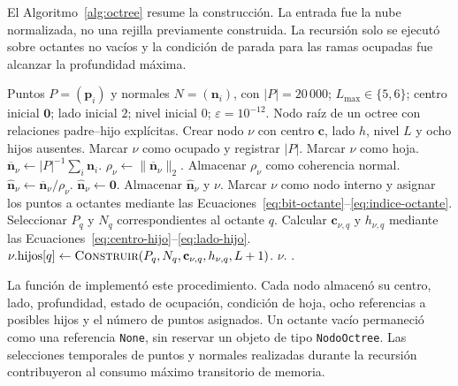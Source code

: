 El Algoritmo~\ref{alg:octree} resume la construcción. La entrada fue la nube normalizada, no una rejilla previamente construida. La recursión solo se ejecutó sobre octantes no vacíos y la condición de parada para las ramas ocupadas fue alcanzar la profundidad máxima.
\begin{algorithm}[H]
\caption{Construcción recursiva del octree adaptativo con poda de octantes vacíos.}
\label{alg:octree}
\begin{algorithmic}[1]
\Require Puntos $P=(\mathbf p_i)$ y normales $N=(\mathbf n_i)$, con $|P|=20\,000$; $L_{\max}\in\{5,6\}$; centro inicial $\mathbf{0}$; lado inicial $2$; nivel inicial $0$; $\varepsilon=10^{-12}$.
\Ensure Nodo raíz de un octree con relaciones padre--hijo explícitas.
    \State Crear nodo $\nu$ con centro $\mathbf c$, lado $h$, nivel $L$ y ocho hijos ausentes.
    \State Marcar $\nu$ como ocupado y registrar $|P|$.
        \State Marcar $\nu$ como hoja.
        \State $\overline{\mathbf n}_\nu \gets |P|^{-1}\sum_i \mathbf n_i$.
        \State $\rho_\nu\gets\|\overline{\mathbf n}_\nu\|_2$.
        \State Almacenar $\rho_\nu$ como coherencia normal.
        \If{$\rho_\nu>\varepsilon$}
            \State $\widehat{\mathbf n}_\nu\gets\overline{\mathbf n}_\nu/\rho_\nu$.
        \Else
            \State $\widehat{\mathbf n}_\nu\gets\mathbf{0}$.
        \EndIf
        \State Almacenar $\widehat{\mathbf n}_\nu$ y \Return $\nu$.
    \EndIf
    \State Marcar $\nu$ como nodo interno y asignar los puntos a octantes mediante las Ecuaciones~\eqref{eq:bit-octante}--\eqref{eq:indice-octante}.
        \State Seleccionar $P_q$ y $N_q$ correspondientes al octante $q$.
            \State Calcular $\mathbf c_{\nu,q}$ y $h_{\nu,q}$ mediante las Ecuaciones~\eqref{eq:centro-hijo}--\eqref{eq:lado-hijo}.
            \State $\nu.\mathrm{hijos}[q]\gets\Call{Construir}{P_q,N_q,\mathbf c_{\nu,q},h_{\nu,q},L+1}$.
        \EndIf
    \EndFor
    \State \Return $\nu$.
\EndFunction
\State \Return {}.
\end{algorithmic}
\end{algorithm}

La función \protect{} de \protect{} implementó este procedimiento. Cada nodo almacenó su centro, lado, profundidad, estado de ocupación, condición de hoja, ocho referencias a posibles hijos y el número de puntos asignados. Un octante vacío permaneció como una referencia \texttt{None}, sin reservar un objeto de tipo \texttt{NodoOctree}. Las selecciones temporales de puntos y normales realizadas durante la recursión contribuyeron al consumo máximo transitorio de memoria.

